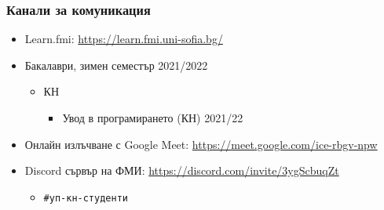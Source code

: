 \documentclass{beamer}
\begin{document}
\begin{frame}
  \frametitle{Канали за комуникация}

  \begin{itemize}
  \item Learn.fmi: \url{https://learn.fmi.uni-sofia.bg/}
  \item Бакалаври, зимен семестър 2021/2022
    \begin{itemize}
    \item КН
      \begin{itemize}
      \item Увод в програмирането (КН) 2021/22
      \end{itemize}
    \end{itemize}
  \item Онлайн излъчване с Google Meet: \url{https://meet.google.com/ice-rbgv-npw}
  \item Discord сървър на ФМИ: \url{https://discord.com/invite/3ygScbuqZt}
    \begin{itemize}
    \item \tt{\#уп-кн-студенти}
    \end{itemize}
  \end{itemize}
\end{frame}
\end{document}
